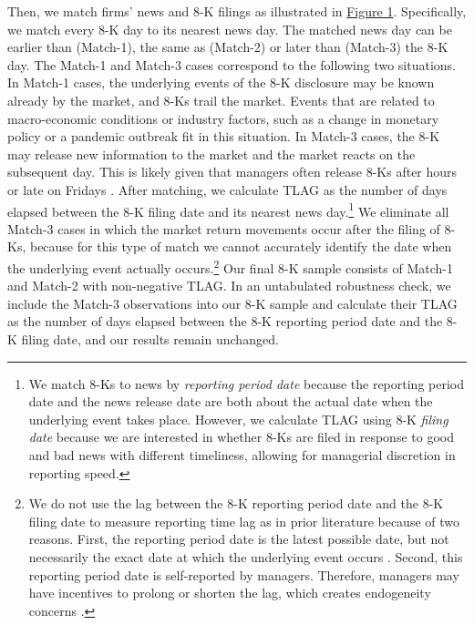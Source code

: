 \documentclass[letterpaper,12pt]{article}
\begin{document}
\begin{spacing}{1.5}
Then, we match firms' news and 8-K filings as illustrated in \hyperref[fig1]{Figure 1}. Specifically, we match every 8-K day to its nearest news day. The matched news day can be earlier than (Match-1), the same as (Match-2) or later than (Match-3) the 8-K day. The Match-1 and Match-3 cases correspond to the following two situations. In Match-1 cases, the underlying events of the 8-K disclosure may be known already by the market, and 8-Ks trail the market. Events that are related to macro-economic conditions or industry factors, such as a change in monetary policy or a pandemic outbreak fit in this situation. In Match-3 cases, the 8-K may release new information to the market and the market reacts on the subsequent day. This is likely given that managers often release 8-Ks after hours or late on Fridays \cite{segalAreManagersStrategic2016}.  After matching, we calculate TLAG as the number of days elapsed between the 8-K filing date and its nearest news day.\footnote{We match 8-Ks to news by \textit{reporting period date} because the reporting period date and the news release date are both about the actual date when the underlying event takes place. However, we calculate TLAG using 8-K \textit{filing date} because we are interested in whether 8-Ks are filed in response to good and bad news with different timeliness, allowing for managerial discretion in reporting speed.} We eliminate all Match-3 cases in which the market return movements occur after the filing of 8-Ks, because for this type of match we cannot accurately identify the date when the underlying event actually occurs.\footnote{We do not use the lag between the 8-K reporting period date and the 8-K filing date to measure reporting time lag as in prior literature \cite{carterRelevanceForm8K1999, niessnerStrategicDisclosureTiming2015, chapmanInformationOverloadDisclosure2019} because of two reasons. First, the reporting period date is the latest possible date, but not necessarily the exact date at which the underlying event occurs \cite{secFinalRuleAdditional2004}. Second, this reporting period date is self-reported by managers. Therefore, managers may have incentives to prolong or shorten the lag, which creates endogeneity concerns \cite{chapmanInformationOverloadDisclosure2019}. } 
Our final 8-K sample consists of Match-1 and Match-2 with non-negative TLAG. In an untabulated robustness check, we include the Match-3 observations into our 8-K sample and calculate their TLAG as the number of days elapsed between the 8-K reporting period date and the 8-K filing date, and our results remain unchanged. 


\end{spacing}
\end{document}
